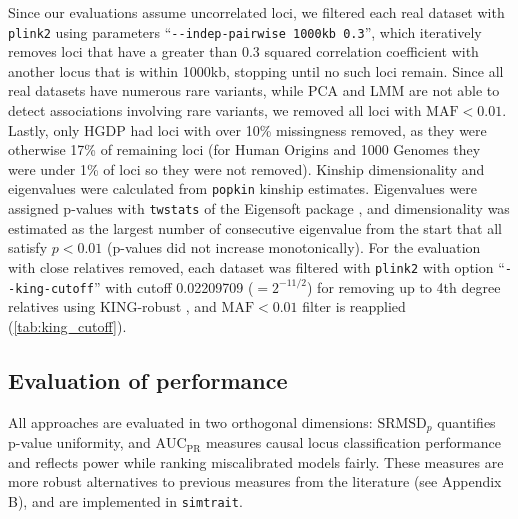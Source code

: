 \documentclass[11pt]{article}
\newcommand{\rmsd}{\text{SRMSD}_p}
\newcommand{\auc}{\text{AUC}_\text{PR}}
\begin{document}
\begin{linenumbers}
Since our evaluations assume uncorrelated loci, we filtered each real dataset with \texttt{plink2} using parameters ``\texttt{-{}-indep-pairwise 1000kb 0.3}'', which iteratively removes loci that have a greater than 0.3 squared correlation coefficient with another locus that is within 1000kb, stopping until no such loci remain.
Since all real datasets have numerous rare variants, while PCA and LMM are not able to detect associations involving rare variants, we removed all loci with $\text{MAF} < 0.01$.
Lastly, only HGDP had loci with over 10\% missingness removed, as they were otherwise 17\% of remaining loci (for Human Origins and 1000 Genomes they were under 1\% of loci so they were not removed).
Kinship dimensionality and eigenvalues were calculated from \texttt{popkin} kinship estimates.
Eigenvalues were assigned p-values with \texttt{twstats} of the Eigensoft package \citep{patterson_population_2006}, and dimensionality was estimated as the largest number of consecutive eigenvalue from the start that all satisfy $p < 0.01$ (p-values did not increase monotonically).
For the evaluation with close relatives removed, each dataset was filtered with \texttt{plink2} with option ``\texttt{-{}-king-cutoff}'' with cutoff 0.02209709 ($= 2^{-11/2}$) for removing up to 4th degree relatives using KING-robust \citep{manichaikul_robust_2010}, and $\text{MAF} < 0.01$ filter is reapplied (\cref{tab:king_cutoff}).

\subsection{Evaluation of performance}

All approaches are evaluated in two orthogonal dimensions: $\rmsd$ quantifies p-value uniformity, and $\auc$ measures causal locus classification performance and reflects power while ranking miscalibrated models fairly.
These measures are more robust alternatives to previous measures from the literature (see Appendix B), and are implemented in \texttt{simtrait}.


\end{linenumbers}
\end{document}
